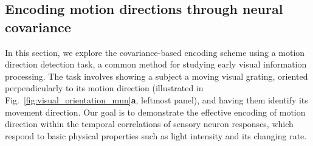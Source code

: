 \subsection{Encoding motion directions through neural covariance}
\label{sec:vo_encode}
In this section, we explore the covariance-based encoding scheme using a motion direction detection task, a common method for studying early visual information processing. 
The task involves showing a subject a moving visual grating, oriented perpendicularly to its motion direction (illustrated in Fig.~\ref{fig:visual_orientation_mnn}\textbf{a}, leftmost panel), and having them identify its movement direction.
Our goal is to demonstrate the effective encoding of motion direction within the temporal correlations of sensory neuron responses, which respond to basic physical properties such as light intensity and its changing rate.

